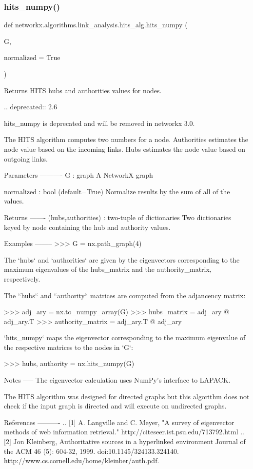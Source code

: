 \subsubsection{\texorpdfstring{hits\+\_\+numpy()}{hits\_numpy()}}
{\footnotesize\ttfamily def networkx.\+algorithms.\+link\+\_\+analysis.\+hits\+\_\+alg.\+hits\+\_\+numpy (\begin{DoxyParamCaption}\item[{}]{G,  }\item[{}]{normalized = {\ttfamily True} }\end{DoxyParamCaption})}

\begin{DoxyVerb}Returns HITS hubs and authorities values for nodes.

.. deprecated:: 2.6

   hits_numpy is deprecated and will be removed in networkx 3.0.

The HITS algorithm computes two numbers for a node.
Authorities estimates the node value based on the incoming links.
Hubs estimates the node value based on outgoing links.

Parameters
----------
G : graph
  A NetworkX graph

normalized : bool (default=True)
   Normalize results by the sum of all of the values.

Returns
-------
(hubs,authorities) : two-tuple of dictionaries
   Two dictionaries keyed by node containing the hub and authority
   values.

Examples
--------
>>> G = nx.path_graph(4)

The `hubs` and `authorities` are given by the eigenvectors corresponding to the
maximum eigenvalues of the hubs_matrix and the authority_matrix, respectively.

The ``hubs`` and ``authority`` matrices are computed from the adjancency
matrix:

>>> adj_ary = nx.to_numpy_array(G)
>>> hubs_matrix = adj_ary @ adj_ary.T
>>> authority_matrix = adj_ary.T @ adj_ary

`hits_numpy` maps the eigenvector corresponding to the maximum eigenvalue
of the respective matrices to the nodes in `G`:

>>> hubs, authority = nx.hits_numpy(G)

Notes
-----
The eigenvector calculation uses NumPy's interface to LAPACK.

The HITS algorithm was designed for directed graphs but this
algorithm does not check if the input graph is directed and will
execute on undirected graphs.

References
----------
.. [1] A. Langville and C. Meyer,
   "A survey of eigenvector methods of web information retrieval."
   http://citeseer.ist.psu.edu/713792.html
.. [2] Jon Kleinberg,
   Authoritative sources in a hyperlinked environment
   Journal of the ACM 46 (5): 604-32, 1999.
   doi:10.1145/324133.324140.
   http://www.cs.cornell.edu/home/kleinber/auth.pdf.
\end{DoxyVerb}

